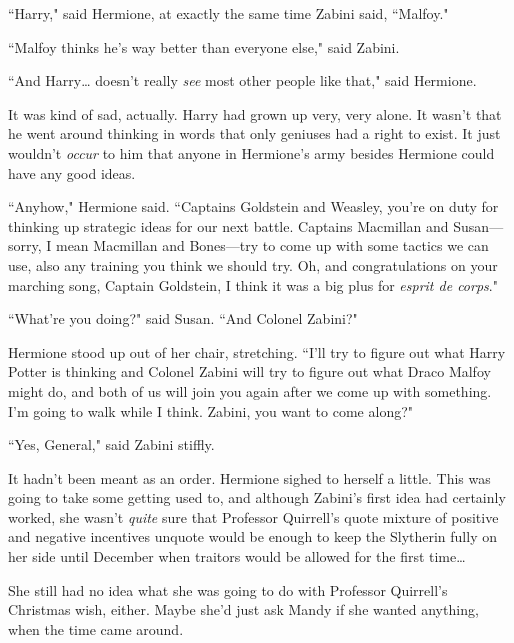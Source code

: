 ``Harry," said Hermione, at exactly the same time Zabini said, ``Malfoy."

``Malfoy thinks he's way better than everyone else," said Zabini.

``And Harry{\ldots} doesn't really \emph{see} most other people like that," said Hermione.

It was kind of sad, actually. Harry had grown up very, very alone. It wasn't that he went around thinking in words that only geniuses had a right to exist. It just wouldn't \emph{occur} to him that anyone in Hermione's army besides Hermione could have any good ideas.

``Anyhow," Hermione said. ``Captains Goldstein and Weasley, you're on duty for thinking up strategic ideas for our next battle. Captains Macmillan and Susan—sorry, I mean Macmillan and Bones—try to come up with some tactics we can use, also any training you think we should try. Oh, and congratulations on your marching song, Captain Goldstein, I think it was a big plus for \emph{esprit de corps}."

``What're you doing?" said Susan. ``And Colonel Zabini?"

Hermione stood up out of her chair, stretching. ``I'll try to figure out what Harry Potter is thinking and Colonel Zabini will try to figure out what Draco Malfoy might do, and both of us will join you again after we come up with something. I'm going to walk while I think. Zabini, you want to come along?"

``Yes, General," said Zabini stiffly.

It hadn't been meant as an order. Hermione sighed to herself a little. This was going to take some getting used to, and although Zabini's first idea had certainly worked, she wasn't \emph{quite} sure that Professor Quirrell's quote mixture of positive and negative incentives unquote would be enough to keep the Slytherin fully on her side until December when traitors would be allowed for the first time{\ldots}

She still had no idea what she was going to do with Professor Quirrell's Christmas wish, either. Maybe she'd just ask Mandy if she wanted anything, when the time came around.

